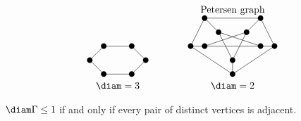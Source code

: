 \begin{example*}
$$
\begin{array}{ccc}
\begin{tikzpicture}
\fill (0, 0) circle (0.1);
\fill (1, 0) circle (0.1);
\fill (-0.5, -0.5) circle (0.1);
\fill (1.5, -0.5) circle (0.1);
\fill (0, -1) circle (0.1);
\fill (1, -1) circle (0.1);
\draw (0, 0) to (1, 0);
\draw (0, 0) to (-0.5, -0.5);
\draw (1, 0) to (1.5, -0.5);
\draw (-0.5, -0.5) to (0, -1);
\draw (1.5, -0.5) to (1, -1);
\draw (0, -1) to (1, -1);
\end{tikzpicture}
& \qquad &
\begin{tikzpicture}
\draw (1, 0) node[above]{Petersen graph};
\fill (0, 0) circle (0.1);
\fill (2, 0) circle (0.1);
\fill (0.5, -0.5) circle (0.1);
\fill (1.5, -0.5) circle (0.1);
\fill (-0.5, -1) circle (0.1);
\fill (0, -1) circle (0.1);
\fill (2.5, -1) circle (0.1);
\fill (2, -1) circle (0.1);
\fill (1, -1.5) circle (0.1);
\fill (1, -2) circle (0.1);
\draw (0, 0) to (2, 0);
\draw (0, 0) to (-0.5, -1);
\draw (0, 0) to (0.5, -0.5);
\draw (2, 0) to (1.5, -0.5);
\draw (2, 0) to (2.5, -1);
\draw (0.5, -0.5) to (1, -1.5);
\draw (0.5, -0.5) to (2, -1);
\draw (1.5, -0.5) to (0, -1);
\draw (1.5, -0.5) to (1, -1.5);
\draw (-0.5, -1) to (0, -1);
\draw (-0.5, -1) to (1, -2);
\draw (0, -1) to (2, -1);
\draw (2, -1) to (2.5, -1);
\draw (2.5, -1) to (1, -2);
\draw (1, -1.5) to (1, -2);
\end{tikzpicture}
\\
\diam = 3 & & \diam = 2
\end{array}
$$
\end{example*}

\begin{note*}
$ \diam \Gamma \le 1 $ if and only if every pair of distinct vertices is adjacent.
\end{note*}


